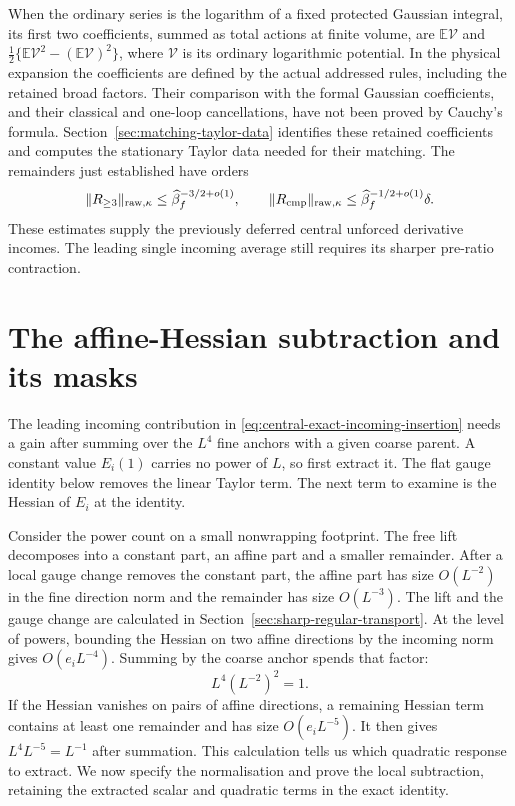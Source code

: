 \documentclass[11pt,reqno]{amsart}
\numberwithin{equation}{section}
\theoremstyle{definition}
\theoremstyle{remark}
\begin{document}
When the ordinary series is the logarithm of a fixed protected
Gaussian integral, its first two coefficients, summed as total
actions at finite volume, are \(\mathbb E\mathcal V\) and
\(\frac12\{\mathbb E\mathcal V^2-(\mathbb E\mathcal V)^2\}\),
where \(\mathcal V\) is its ordinary logarithmic potential.
In the physical expansion the coefficients are defined by
the actual addressed rules, including the retained broad
factors. Their comparison with the formal Gaussian coefficients,
and their classical and one-loop cancellations, have not been
proved by Cauchy's formula. Section~\ref{sec:matching-taylor-data} identifies these retained
coefficients and computes the stationary Taylor data needed for
their matching. The remainders just established have orders
\begin{equation}
 \|R_{\ge3}\|_{\mathrm{raw},\kappa}
                  \le\widehat\beta_f^{-3/2+o(1)},\qquad
 \|R_{\rm cmp}\|_{\mathrm{raw},\kappa}
                  \le\widehat\beta_f^{-1/2+o(1)}\delta.
 \label{eq:central-remainder-orders}
\end{equation}
These estimates supply the previously deferred central
unforced derivative incomes. The leading single incoming
average still requires its sharper pre-ratio contraction.

\section{The affine-Hessian subtraction and its masks}
\label{sec:affine-local-reset}

The leading incoming contribution in
\eqref{eq:central-exact-incoming-insertion} needs a
gain after summing over the \(L^4\) fine anchors
with a given coarse parent. A constant value \(E_i(1)\)
carries no power of \(L\), so first extract it.
The flat gauge identity below removes the linear
Taylor term. The next term to examine is the Hessian
of \(E_i\) at the identity.

Consider the power count on a small nonwrapping
footprint. The free lift decomposes into a constant
part, an affine part and a smaller remainder. After
a local gauge change removes the constant part, the
affine part has size \(O(L^{-2})\) in the fine direction
norm and the remainder has size \(O(L^{-3})\).
The lift and the gauge change are calculated in
Section~\ref{sec:sharp-regular-transport}. At the
level of powers, bounding the Hessian on two affine
directions by the incoming norm gives \(O(e_iL^{-4})\).
Summing by the coarse anchor spends that factor:
\[
                       L^4(L^{-2})^2=1.
\]
If the Hessian vanishes on pairs of affine directions,
a remaining Hessian term contains at least one
remainder and has size \(O(e_iL^{-5})\).
It then gives \(L^4L^{-5}=L^{-1}\) after summation.
This calculation tells us which quadratic response to
extract. We now specify the normalisation and prove
the local subtraction, retaining the extracted scalar
and quadratic terms in the exact identity.
\end{document}
